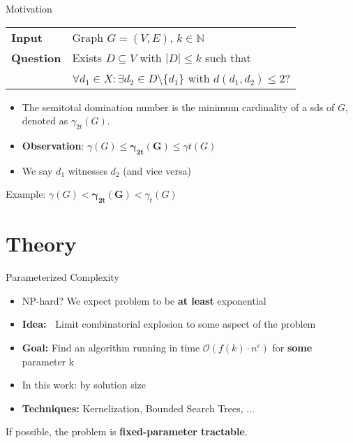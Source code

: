 \begin{frame}[c]{Motivation}
\begin{tcolorbox}[colback=TUMBlueLighter,title=\sdom]
    \begin{tabularx}{1.0\textwidth}{>{\hsize=0.30\hsize}X>{\hsize=0.8\hsize}X}
        \textbf{Input}    & Graph $G = (V, E)$, $k \in \mathbb{N}$\\
        \textbf{Question} & Exists $D \subseteq V$ with $|D| \leq k$ such that  \\
        & $\forall d_1 \in X :\exists d_2 \in D \setminus \{d_1\}$ with ${d(d_1, d_2) \leq 2}$? \\
    \end{tabularx}
\end{tcolorbox}

\begin{itemize}
    \pause \item The semitotal domination number is the minimum cardinality of a sds of $G$, denoted as $\gamma_{2t}(G)$.
    \pause \item \textbf{Observation}: $\gamma(G) \leq  \mathbf{\gamma_{2t}(G)}  \leq \gamma{t}(G)$
    \pause \item We say $d_1$ witnesses $d_2$ (and vice versa)
\end{itemize}
\end{frame}

\begin{frame}[c]{Example: $\gamma(G) < \mathbf{\gamma_{2t}(G)} < \gamma_t(G)$}
\begin{figure}[!ht]
    \end{figure}
\end{frame}

\section{Theory}
\begin{frame}[c]{Parameterized Complexity}
    \begin{itemize}
        \pause \item NP-hard? We expect problem to be  \textbf{at least} exponential \\
        \pause \item \textbf{Idea:~} Limit combinatorial explosion to some aspect of the problem\\
        \pause \item \textbf{Goal: } Find an algorithm running in time $\mathcal{O}(f(k) \cdot n^c)$ for \textbf{some} parameter k
        \pause \item In this work: by solution size
        \pause \item \textbf{Techniques: } Kernelization, Bounded Search Trees, ... 
    \end{itemize}

If possible, the problem is \textbf{fixed-parameter tractable}.

\end{frame}

